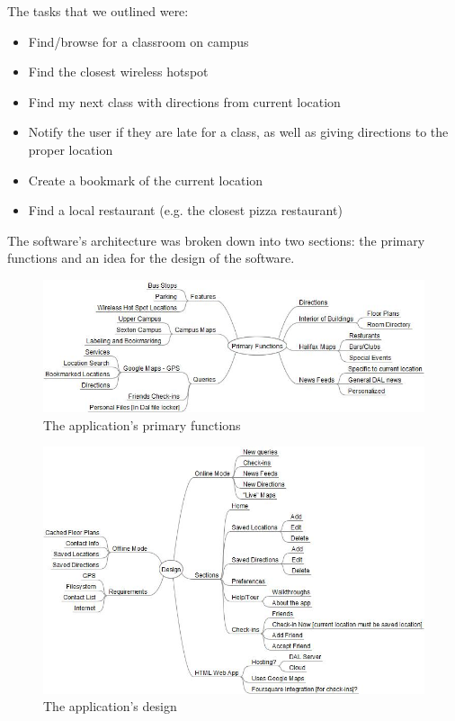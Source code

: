 \documentclass{article}
\begin{document}
The tasks that we outlined were:
\begin{itemize}
\item Find/browse for a classroom on campus
\item Find the closest wireless hotspot
\item Find my next class with directions from current location
\item Notify the user if they are late for a class, as well as giving directions to
the proper location
\item Create a bookmark of the current location
\item Find a local restaurant (e.g. the closest pizza restaurant)
\end{itemize}

The software's architecture was broken down into two sections: the primary
functions and an idea for the design of the software.

\begin{figure}
\includegraphics[width=\textwidth]{img/Primary-Functions.jpg}
\caption{The application's primary functions}
\end{figure}

\begin{figure}
\includegraphics[width=\textwidth]{img/Design.jpg}
\caption{The application's design}
\end{figure}
\end{document}
